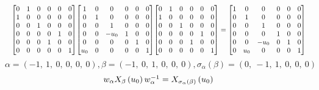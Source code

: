 \documentclass[11pt]{article}
\theoremstyle{definition}
\begin{document}
\[
\scaletoalign{\textwidth}{{\left[\begin{matrix}0 & 1 & 0 & 0 & 0 & 0\\1 & 0 & 0 & 0 & 0 & 0\\0 & 0 & 1 & 0 & 0 & 0\\0 & 0 & 0 & 0 & 1 & 0\\0 & 0 & 0 & 1 & 0 & 0\\0 & 0 & 0 & 0 & 0 & 1\end{matrix}\right]} {\left[\begin{matrix}1 & 0 & 0 & 0 & 0 & 0\\0 & 1 & 0 & 0 & 0 & 0\\0 & 0 & 1 & 0 & 0 & 0\\0 & 0 & - u_{0} & 1 & 0 & 0\\0 & 0 & 0 & 0 & 1 & 0\\u_{0} & 0 & 0 & 0 & 0 & 1\end{matrix}\right]} {\left[\begin{matrix}0 & 1 & 0 & 0 & 0 & 0\\1 & 0 & 0 & 0 & 0 & 0\\0 & 0 & 1 & 0 & 0 & 0\\0 & 0 & 0 & 0 & 1 & 0\\0 & 0 & 0 & 1 & 0 & 0\\0 & 0 & 0 & 0 & 0 & 1\end{matrix}\right]} = {\left[\begin{matrix}1 & 0 & 0 & 0 & 0 & 0\\0 & 1 & 0 & 0 & 0 & 0\\0 & 0 & 1 & 0 & 0 & 0\\0 & 0 & 0 & 1 & 0 & 0\\0 & 0 & - u_{0} & 0 & 1 & 0\\0 & u_{0} & 0 & 0 & 0 & 1\end{matrix}\right]}}
\]
\[
\alpha = \left( -1, \  1, \  0, \  0, \  0, \  0\right), \beta = \left( -1, \  0, \  1, \  0, \  0, \  0\right), \sigma_{\alpha}(\beta) = \left( 0, \  -1, \  1, \  0, \  0, \  0\right)
\]
\[
\scaletoalign{\textwidth}{w_{\alpha} X_{\beta}\left(u_{0}\right) w_{\alpha}^{-1} = X_{\sigma_{\alpha}\left(\beta\right)}\left(u_{0}\right)}
\]
\end{document}
